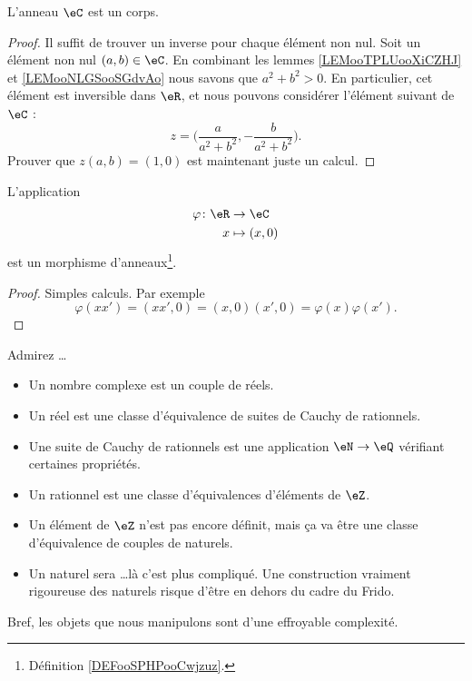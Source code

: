 \begin{lemma}
    L'anneau \( \eC\) est un corps.
\end{lemma}

\begin{proof}
    Il suffit de trouver un inverse pour chaque élément non nul. Soit un élément non nul \( (a,b)\in \eC\). En combinant les lemmes \ref{LEMooTPLUooXiCZHJ} et \ref{LEMooNLGSooSGdvAo} nous savons que \( a^2+b^2>0\). En particulier, cet élément est inversible dans \( \eR\), et nous pouvons considérer l'élément suivant de \( \eC\) :
    \begin{equation}
        z=\big( \frac{ a }{ a^2+b^2 }, -\frac{ b }{ a^2+b^2 } \big).
    \end{equation}
    Prouver que \( z(a,b)=(1,0)\) est maintenant juste un calcul.
\end{proof}

\begin{lemma}
    L'application
    \begin{equation}
        \begin{aligned}
            \varphi\colon \eR&\to \eC \\
            x&\mapsto (x,0) 
        \end{aligned}
    \end{equation}
    est un morphisme d'anneaux\footnote{Définition \ref{DEFooSPHPooCwjzuz}.}.
\end{lemma}

\begin{proof}
    Simples calculs. Par exemple
    \begin{equation}
        \varphi(xx')=(xx',0)=(x,0)(x',0)=\varphi(x)\varphi(x').
    \end{equation}
\end{proof}

\begin{normaltext}
    Admirez \ldots
    \begin{itemize}
        \item Un nombre complexe est un couple de réels.
        \item Un réel est une classe d'équivalence de suites de Cauchy de rationnels.
        \item Une suite de Cauchy de rationnels est une application \( \eN\to \eQ\) vérifiant certaines propriétés.
        \item Un rationnel est une classe d'équivalences d'éléments de \( \eZ\).
        \item Un élément de \( \eZ\) n'est pas encore définit, mais ça va être une classe d'équivalence de couples de naturels.
        \item Un naturel sera \ldots là c'est plus compliqué. Une construction vraiment rigoureuse des naturels risque d'être en dehors du cadre du Frido.
    \end{itemize}
    Bref, les objets que nous manipulons sont d'une effroyable complexité. 
\end{normaltext}

